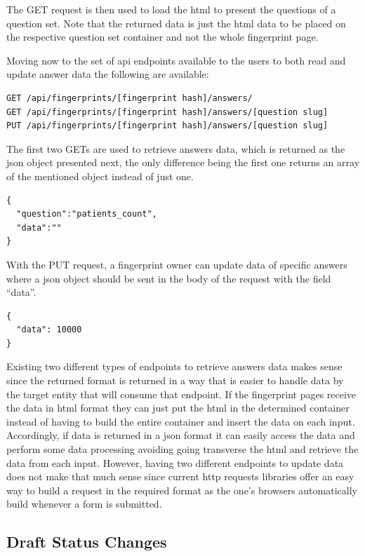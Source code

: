 The GET request is then used to load the \gls{html} to present the questions of a question set.
Note that the returned data is just the \gls{html} data to be placed on the respective question set container and not the whole fingerprint page.

Moving now to the set of \gls{api} endpoints available to the users to both read and update answer data the following are available:

\begin{verbatim}
GET /api/fingerprints/[fingerprint hash]/answers/
GET /api/fingerprints/[fingerprint hash]/answers/[question slug]
PUT /api/fingerprints/[fingerprint hash]/answers/[question slug]
\end{verbatim}

The first two GETs are used to retrieve answers data, which is returned as the \gls{json} object presented next, the only difference being the first one returns an array of the mentioned object instead of just one.

\begin{verbatim}
{
  "question":"patients_count",
  "data":""
}
\end{verbatim}

With the PUT request, a fingerprint owner can update data of specific answers where a \gls{json} object should be sent in the body of the request with the field ``data''.

\begin{verbatim}
{
  "data": 10000
}
\end{verbatim}

Existing two different types of endpoints to retrieve answers data makes sense since the returned format is returned in a way that is easier to handle data by the target entity that will consume that endpoint.
If the fingerprint pages receive the data in \gls{html} format they can just put the \gls{html} in the determined container instead of having to build the entire container and insert the data on each input.
Accordingly, if data is returned in a \gls{json} format it can easily access the data and perform some data processing avoiding going transverse the \gls{html} and retrieve the data from each input.
However, having two different endpoints to update data does not make that much sense since current \gls{http} requests libraries offer an easy way to build a request in the required format as the one's browsers automatically build whenever a form is submitted.

\subsection*{Draft Status Changes}

